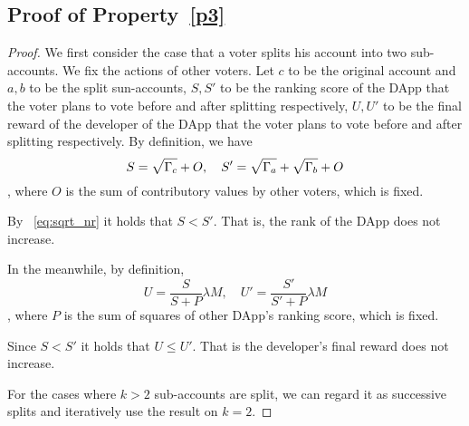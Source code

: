 \subsection{Proof of Property~\ref{p3}}
\begin{proof}
	We first consider the case that a voter splits his account into two sub-accounts. We fix the actions of other voters. Let $c$ to be the original account and $a,b$ to be the split sun-accounts, $S,S'$ to be the ranking score of the DApp that the voter plans to vote before and after splitting respectively, $U,U'$ to be the final reward of the developer of the DApp that the voter plans to vote before and after splitting respectively. By definition, we have
	$$S= \sqrt{\Gamma_c}+O,\quad S'=\sqrt{\Gamma_a}+\sqrt{\Gamma_b}+O$$,
	where $O$ is the sum of contributory values by other voters, which is fixed.

	By ~\ref{eq:sqrt_nr} it holds that $S < S'$. That is, the rank of the DApp does not increase.

	In the meanwhile, by definition,
	$$U = \frac{S}{S+P}\lambda M,\quad U' = \frac{S'}{S'+P} \lambda M$$,
	where $P$ is the sum of squares of other DApp's ranking score, which is fixed.

	Since $S < S'$ it holds that $U \leq U'$. That is the developer's final reward does not increase.

	For the cases where $k>2$ sub-accounts are split, we can regard it as successive splits and iteratively use the result on $k=2$.

\end{proof}
